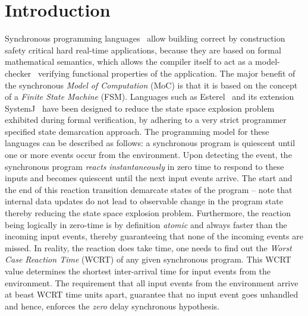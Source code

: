 \section{Introduction}
\label{sec:introduction}

Synchronous programming languages~\cite{berry92} allow building correct
by construction safety critical hard real-time applications, because
they are based on formal mathematical semantics, which allows the
compiler itself to act as a model-checker~\cite{jagadeesan1995safety}
verifying functional properties of the application. The major benefit of
the synchronous \textit{Model of Computation} (MoC) is that it is based
on the concept of a \textit{Finite State Machine} (FSM). Languages such
as Esterel~\cite{berry92} and its extension SystemJ~\cite{amal10} have
been designed to reduce the state space explosion problem exhibited
during formal verification, by adhering to a very strict programmer
specified state demarcation approach. The programming model for these
languages can be described as follows: a synchronous program is
quiescent until one or more events occur from the environment. Upon
detecting the event, the synchronous program \textit{reacts}
\textit{instantaneously} in zero time to respond to these inputs and
becomes quiescent until the next input events arrive. The start and the
end of this reaction transition demarcate states of the program -- note
that internal data updates do not lead to {\color{red} observable}
change in the program state thereby reducing the state space explosion
problem. Furthermore, the reaction being logically in zero-time is by
definition \textit{atomic} and always faster than the incoming input
events, thereby guaranteeing that none of the incoming events are
missed. In reality, the reaction does take time, one needs to find out
the \textit{Worst Case Reaction Time} (WCRT) of any given synchronous
program. This WCRT value determines the shortest inter-arrival time for
input events from the environment. {\color{black} The requirement that
  all input events from the environment arrive at beast WCRT time units
  apart, guarantee that no input event goes unhandled and hence,
  enforces the \textit{zero} delay synchronous hypothesis.}

